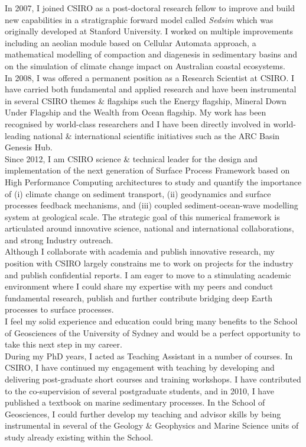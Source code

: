 \documentclass[11pt]{article}
\begin{document}
In 2007, I joined CSIRO as a post-doctoral research fellow to improve and build new capabilities in a stratigraphic forward model called \textit{Sedsim} which was originally developed at Stanford University. I worked on multiple improvements including an aeolian module based on Cellular Automata approach, a mathematical modelling of compaction and diagenesis in sedimentary basins and on the simulation of climate change impact on Australian coastal ecosystems.\\

In 2008, I was offered a permanent position as a Research Scientist at CSIRO. I have carried both fundamental and applied research and have been instrumental in several CSIRO themes \& flagships such the Energy flagship, Mineral Down Under Flagship and the Wealth from Ocean flagship. My work has been recognised by world-class researchers and I have been directly involved in world-leading national \& international scientific initiatives such as the ARC Basin Genesis Hub. \\

Since 2012, I am CSIRO science \& technical leader for the design and implementation of the next generation of Surface Process Framework based on High Performance Computing architectures to study and quantify the importance of (i) climate change on sediment transport, (ii) geodynamics and surface processes feedback mechanisms, and (iii) coupled sediment-ocean-wave modelling system at geological scale. The strategic goal of this numerical framework is articulated around innovative science, national and international collaborations, and strong Industry outreach. \\

Although I collaborate with academia and publish innovative research, my position with CSIRO largely constrains me to work on projects for the industry and publish confidential reports. I am eager to move to a stimulating academic environment where I could share my expertise with my peers and conduct fundamental research, publish and further contribute bridging deep Earth processes to surface processes. \\

I feel my solid experience and education could bring many benefits to the School of Geosciences of the University of Sydney and would be a perfect opportunity to take this next step in my career. \\

During my PhD years, I acted as Teaching Assistant in a number of courses. In CSIRO, I have continued my engagement with teaching by developing and delivering post-graduate short courses and training workshops. I have contributed to the co-supervision of several postgraduate students, and in 2010, I have published a textbook on marine sedimentary processes. In the School of Geosciences, I could further develop my teaching and advisor skills by being instrumental in several of the Geology \& Geophysics and Marine Science units of study already existing within the School. \\
\end{document}
